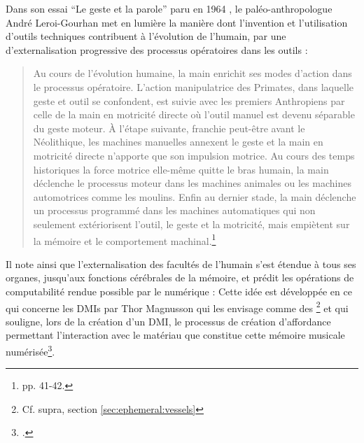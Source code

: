 \noindent Dans son essai ``Le geste et la parole'' paru en 1964 \cite{leroi-gourhan_geste_1964}, le paléo-anthropologue André Leroi-Gourhan met en lumière la manière dont l'invention et l'utilisation d'outils techniques contribuent à l'évolution de l'humain, par une d'externalisation progressive des processus opératoires dans les outils :
\vspace{-1em}
\begin{quotation}
	Au cours de l’évolution humaine, la main enrichit ses modes d’action dans le processus opératoire. L’action manipulatrice des Primates, dans laquelle geste et outil se confondent, est suivie avec les premiers Anthropiens par celle de la main en motricité directe où l’outil manuel est devenu séparable du geste moteur. À l’étape suivante, franchie peut-être avant le Néolithique, les machines manuelles annexent le geste et la main en motricité directe n’apporte que son impulsion motrice. Au cours des temps historiques la force motrice elle-même quitte le bras humain, la main déclenche le processus moteur dans les machines animales ou les machines automotrices comme les moulins. Enfin au dernier stade, la main déclenche un processus programmé dans les machines automatiques qui non seulement extériorisent l’outil, le geste et la motricité, mais empiètent sur la mémoire et le comportement machinal.\footnote{\cite{leroi-gourhan_geste_1964} pp. 41-42.}
\end{quotation}
\indent Il note ainsi que l’externalisation des facultés de l'humain s’est étendue à tous ses organes, jusqu'aux fonctions cérébrales de la mémoire, et prédit les opérations de computabilité rendue possible par le numérique :  Cette idée est développée en ce qui concerne les \glspl{DMI} par Thor Magnusson qui les envisage comme des \footnote{Cf. supra, section \ref{sec:ephemeral:vessels}} et qui souligne, lors de la création d'un \gls{DMI}, le processus de création d'affordance permettant l'interaction avec le matériau que constitue cette mémoire musicale numérisée\footnote{ \cite{magnusson_epistemic_2009}.}.

